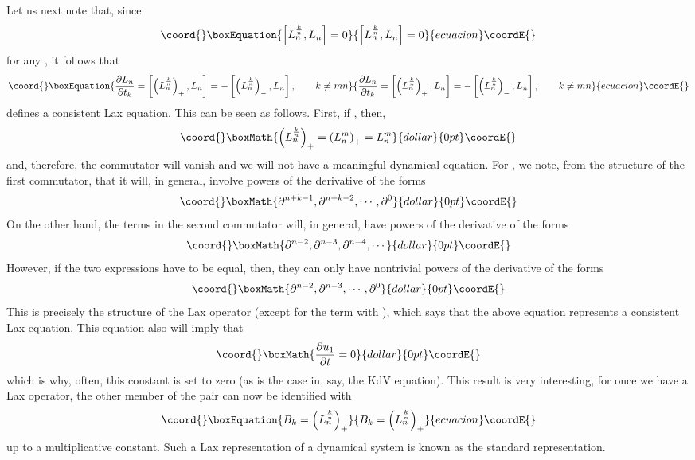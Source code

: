 \documentclass[a4paper,11pt]{article}
\begin{document}
Let us next note that, since
\begin{equation}\coord{}\boxEquation{
\left[ L_{n}^{k\over n} , L_{n} \right] = 0
}{
\left[ L_{n}^{k\over n} , L_{n} \right] = 0
}{ecuacion}\coordE{}\end{equation}
for any \coordHE{}, it follows that
\begin{equation}\coord{}\boxEquation{
{\partial L_{n}\over \partial t_{k}} = \left[\left(L_{n}^{k\over
n}\right)_{+} , L_{n} \right] = - \left[ \left(L_{n}^{k\over
n}\right)_{-} , L_{n} \right], \qquad k \neq mn
}{
{\partial L_{n}\over \partial t_{k}} = \left[\left(L_{n}^{k\over
n}\right)_{+} , L_{n} \right] = - \left[ \left(L_{n}^{k\over
n}\right)_{-} , L_{n} \right], \qquad k \neq mn
}{ecuacion}\coordE{}\end{equation} defines a consistent Lax equation. This can be seen as
follows. First, if \coordHE{}, then, 
$$\coord{}\boxMath{
\left(L_{n}^{k\over n}\right)_{+} = \left(L_{n}^{m}\right)_{+} =
L_{n}^{m}
}{dollar}{0pt}\coordE{}$$ and, therefore, the commutator will vanish and we will not have a
meaningful dynamical equation. For \coordHE{}, we note, from the
structure of the first commutator, that it will, in general, involve
powers  of the derivative of the forms
$$\coord{}\boxMath{
\partial^{n+k -1}, \partial^{n+k-2},\cdots , \partial^{0}
}{dollar}{0pt}\coordE{}$$
On the other hand, the terms in the second commutator will, in
general, have  powers of the derivative of the forms
$$\coord{}\boxMath{
\partial^{n-2}, \partial^{n-3}, \partial^{n-4},\cdots
}{dollar}{0pt}\coordE{}$$
However, if the two expressions have to be equal, then, they can only
have nontrivial powers of the derivative of the forms
$$\coord{}\boxMath{
\partial^{n-2}, \partial^{n-3}, \cdots , \partial^{0}
}{dollar}{0pt}\coordE{}$$
This is precisely the structure of the Lax operator (except for the
term with \coordHE{}), which says that the above equation
represents a consistent Lax equation. This equation also will imply
that
$$\coord{}\boxMath{
{\partial u_{1}\over \partial t} = 0
}{dollar}{0pt}\coordE{}$$
which is why, often, this constant is set to zero (as is the case in,
say, the KdV equation). This result is very interesting, for once we
have a Lax operator, the other member of the pair can now be
identified with
\begin{equation}\coord{}\boxEquation{
B_{k} = \left(L_{n}^{k\over n}\right)_{+}
}{
B_{k} = \left(L_{n}^{k\over n}\right)_{+}
}{ecuacion}\coordE{}\end{equation}
up to a multiplicative constant. Such a Lax representation of a
dynamical system is known as the standard representation.
\end{document}
